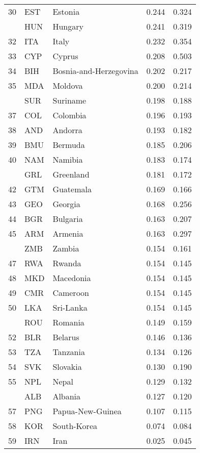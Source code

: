 \begin{table}
\begin{tabular}[t]{rllrr}
30 & EST & Estonia & 0.244 & 0.324\\
\addlinespace
31 & HUN & Hungary & 0.241 & 0.319\\
32 & ITA & Italy & 0.232 & 0.354\\
33 & CYP & Cyprus & 0.208 & 0.503\\
34 & BIH & Bosnia-and-Herzegovina & 0.202 & 0.217\\
35 & MDA & Moldova & 0.200 & 0.214\\
\addlinespace
36 & SUR & Suriname & 0.198 & 0.188\\
37 & COL & Colombia & 0.196 & 0.193\\
38 & AND & Andorra & 0.193 & 0.182\\
39 & BMU & Bermuda & 0.185 & 0.206\\
40 & NAM & Namibia & 0.183 & 0.174\\
\addlinespace
41 & GRL & Greenland & 0.181 & 0.172\\
42 & GTM & Guatemala & 0.169 & 0.166\\
43 & GEO & Georgia & 0.168 & 0.256\\
44 & BGR & Bulgaria & 0.163 & 0.207\\
45 & ARM & Armenia & 0.163 & 0.297\\
\addlinespace
46 & ZMB & Zambia & 0.154 & 0.161\\
47 & RWA & Rwanda & 0.154 & 0.145\\
48 & MKD & Macedonia & 0.154 & 0.145\\
49 & CMR & Cameroon & 0.154 & 0.145\\
50 & LKA & Sri-Lanka & 0.154 & 0.145\\
\addlinespace
51 & ROU & Romania & 0.149 & 0.159\\
52 & BLR & Belarus & 0.146 & 0.136\\
53 & TZA & Tanzania & 0.134 & 0.126\\
54 & SVK & Slovakia & 0.130 & 0.190\\
55 & NPL & Nepal & 0.129 & 0.132\\
\addlinespace
56 & ALB & Albania & 0.127 & 0.120\\
57 & PNG & Papua-New-Guinea & 0.107 & 0.115\\
58 & KOR & South-Korea & 0.074 & 0.084\\
59 & IRN & Iran & 0.025 & 0.045\\
\bottomrule
\end{tabular}
\end{table}